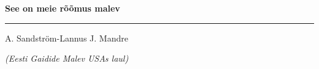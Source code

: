 \documentclass[10pt]{book}
\begin{document}
{
  \samepage
  \raggedbottom
  \raggedright
  \sloppy


  \vspace{0.2in}
    \centerline{
      \bfseries
      \large See on meie r\~o\~omus malev
    }
  \nopagebreak[4]
  \vspace{0.1in}
  \nopagebreak[4]
  \hrule height 0.05ex
  \nopagebreak[4]
  \vspace{-0.05in}

  {\footnotesize A. Sandstr\"om-Lannus \hfill J. Mandre }\\
  \vspace{0.01in}

  {\em {\footnotesize (Eesti Gaidide Malev USAs laul) } }
  \vspace{0.01in}


}
\end{document}
